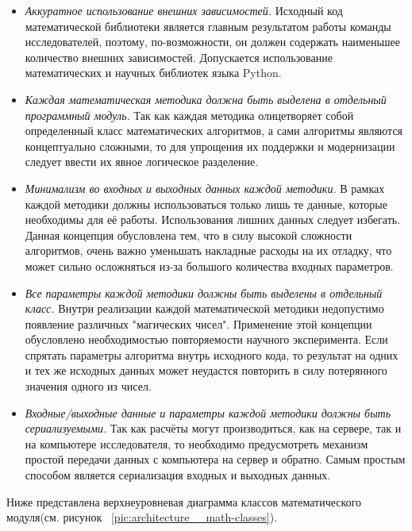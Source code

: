 \begin{itemize}
    \item {
        \textit{Аккуратное использование внешних зависимостей.}
        Исходный код математической библиотеки является главным результатом работы команды исследователей,
        поэтому, по-возможности, он должен содержать наименьшее количество внешних зависимостей.
        Допускается использование математических и научных библиотек языка Python.
    }
    \item {
        \textit{Каждая математическая методика должна быть выделена в отдельный программный модуль.}
        Так как каждая методика олицетворяет собой определенный класс математических алгоритмов,
        а сами алгоритмы являются концептуально сложными, то для упрощения их поддержки и модернизации
        следует ввести их явное логическое разделение.
    }
    \item {
        \textit{Минимализм во входных и выходных данных каждой методики.}
        В рамках каждой методики должны использоваться только лишь те данные, которые необходимы для её работы.
        Использования лишних данных следует избегать.
        Данная концепция обусловлена тем, что в силу высокой сложности алгоритмов,
        очень важно уменьшать накладные расходы на их отладку, что может сильно осложняться
        из-за большого количества входных параметров.
    }
    \item {
        \textit{Все параметры каждой методики должны быть выделены в отдельный класс.}
        Внутри реализации каждой математической методики недопустимо появление различных "магических чисел".
        Применение этой концепции обусловлено необходимостью повторяемости научного эксперимента.
        Если спрятать параметры алгоритма внутрь исходного кода, то результат на одних и тех же исходных данных
        может неудастся повторить в силу потерянного значения одного из чисел.
    }
    \item {
        \textit{Входные/выходные данные и параметры каждой методики должны быть сериализуемыми.}
        Так как расчёты могут производиться, как на сервере, так и на компьютере исследователя, то необходимо
        предусмотреть механизм простой передачи данных с компьютера на сервер и обратно. Самым простым способом
        является сериализация входных и выходных данных.
    }
\end{itemize}

Ниже представлена верхнеуровневая диаграмма классов математического
модуля(см. рисунок \ \ref{pic:architecture__math-classes}).


